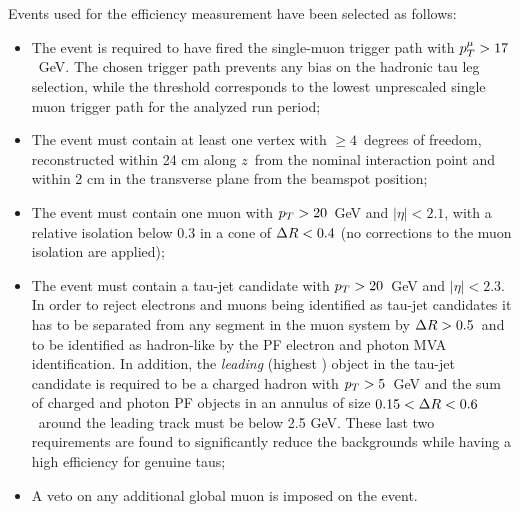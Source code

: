 Events used for the efficiency measurement have been selected as follows:
\begin{itemize}
\item The event is required to have fired the single-muon trigger path with $p_{T}^\mu > 17$~GeV. The chosen trigger path prevents any bias on the hadronic tau leg selection, while the \pT threshold corresponds to the lowest unprescaled single muon trigger path for the analyzed run period;
\item The event must contain at least one vertex with $\geq 4$\ degrees of freedom, reconstructed within 24 cm along $z$\ from the nominal interaction point and within 2 cm in the transverse plane from the beamspot position;
\item The event must contain one muon with $p_{T} > 20$\ GeV and $|\eta| < 2.1$, with a relative isolation below 0.3 in a cone of $\Delta R < 0.4$ (no \db corrections to the muon isolation are applied);
\item The event must contain a tau-jet candidate with $p_{T} > 20$\ GeV and $|\eta| < 2.3$. In order to reject electrons and muons being identified as tau-jet candidates it has to be separated from any segment in the muon system by $\Delta R > 0.5$\ and to be identified as hadron-like by the PF electron and photon MVA identification. In addition, the \emph{leading} (highest \pT) object in the tau-jet candidate is required to be a charged hadron with $p_{T} > 5$\ GeV and the \pT sum of charged and photon PF objects in an annulus of size $0.15 < \Delta R < 0.6$\ around the leading track must be below 2.5 GeV. These last two requirements are found to significantly reduce the backgrounds while having a high efficiency for genuine taus;%
\item A veto on any additional global muon is imposed on the event.
\end{itemize}

